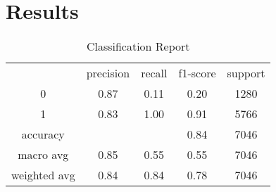 \section{Results}
\begin{center}
    \begin{table}
	\begin{tabular}{ c c c c c}
		& precision & recall & f1-score & support \\
		0 & 0.87 & 0.11 & 0.20 & 1280 \\
		1 & 0.83 & 1.00 & 0.91 & 5766 \\
		accuracy & & & 0.84 & 7046 \\
		macro avg & 0.85 & 0.55 & 0.55 & 7046 \\
		weighted avg & 0.84 & 0.84 & 0.78 & 7046 \\


	\end{tabular}
	\caption{Classification Report}
    \label{Classification Report}
	\end{table}
\end{center}
